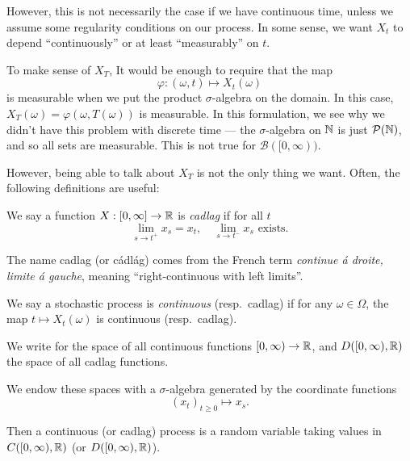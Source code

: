 \documentclass[a4paper]{article}
\begin{document}
However, this is not necessarily the case if we have continuous time, unless we assume some regularity conditions on our process. In some sense, we want $X_t$ to depend ``continuously'' or at least ``measurably'' on $t$.

To make sense of $X_T$, It would be enough to require that the map
\[
  \varphi: (\omega, t) \mapsto X_t(\omega)
\]
is measurable when we put the product $\sigma$-algebra on the domain. In this case, $X_T(\omega) = \varphi(\omega, T(\omega))$ is measurable. In this formulation, we see why we didn't have this problem with discrete time --- the $\sigma$-algebra on $\mathbb{N}$ is just $\mathcal{P}(\mathbb{N})$, and so all sets are measurable. This is not true for $\mathcal{B}([0, \infty))$.

However, being able to talk about $X_T$ is not the only thing we want. Often, the following definitions are useful:

\begin{defi}
  We say a function $X: [0, \infty] \to \mathbb{R}$ is \emph{cadlag} if for all $t$
  \[
    \lim_{s \to t^+} x_s = x_t,\quad \lim_{s \to t^-}x_s\text{ exists}.
  \]
\end{defi}
The name cadlag (or c\'adl\'ag) comes from the French term \emph{continue \'a droite, limite \'a gauche}, meaning ``right-continuous with left limits''.

\begin{defi}
  We say a stochastic process is \emph{continuous} (resp.\ cadlag) if for any $\omega \in \Omega$, the map $t \mapsto X_t (\omega)$ is continuous (resp.\ cadlag).
\end{defi}

\begin{notation}
  We write \term{$C([0, \infty), \R)$} for the space of all continuous functions $[0, \infty) \to \mathbb{R}$, and $D([0, \infty), \R)$ the space of all cadlag functions.\index{$C([0, \infty),\R)$}\index{$D([0, \infty), \R)$}

  We endow these spaces with a $\sigma$-algebra generated by the coordinate functions
  \[
    (x_t)_{t \geq 0} \mapsto x_s.
  \]
\end{notation}

Then a continuous (or cadlag) process is a random variable taking values in $C([0, \infty), \R)$ (or $D([0, \infty), \R)$).
\end{document}
